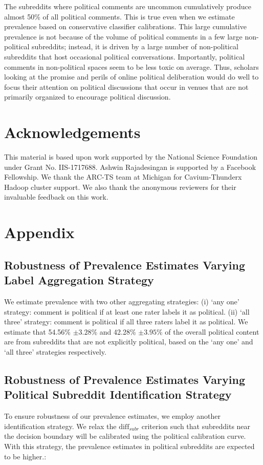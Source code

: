 \documentclass[letterpaper]{article} %
\begin{document}
The subreddits where political comments are uncommon cumulatively produce almost 50\% of all political comments. This is true even when we estimate prevalence based on conservative classifier calibrations. This large cumulative prevalence is not because of the volume of political comments in a few large non-political subreddits; instead, it is driven by a large number of non-political subreddits that host occasional political conversations. Importantly, political comments in non-political spaces seem to be less toxic on average. Thus, scholars looking at the promise and perils of online political deliberation would do well to focus their attention on political discussions that occur in venues that are not primarily organized to encourage political discussion.


\section*{Acknowledgements}
This material is based upon work supported by the National Science Foundation under Grant No. IIS-1717688. Ashwin Rajadesingan is supported by a Facebook Fellowship. We thank the ARC-TS team at Michigan for Cavium-Thunderx Hadoop cluster support. We also thank the anonymous reviewers for their invaluable feedback on this work.



\section*{Appendix}
\renewcommand{\thesubsection}{\Alph{subsection}}
\subsection{Robustness of Prevalence Estimates Varying Label Aggregation Strategy}\label{ro_agg_strategy}
We estimate prevalence with two other aggregating strategies: (i) `any one' strategy: comment is political if at least one rater labels it as political. (ii) `all three' strategy: comment is political if all three raters label it as political. We estimate that 54.56\% $\pm 3.28\%$ and 42.28\% $\pm 3.95\%$ of the overall political content are from subreddits that are not explicitly political, based on the `any one' and `all three' strategies respectively.

\subsection{Robustness of Prevalence Estimates Varying Political Subreddit Identification Strategy}\label{ro_calibrator}
To ensure robustness of our prevalence estimates, we employ another identification strategy. We relax the $\text{diff}_{subr}$ criterion such that subreddits near the decision boundary will be calibrated using the political calibration curve. With this strategy, the prevalence estimates in political subreddits are expected to be higher.:
\end{document}
